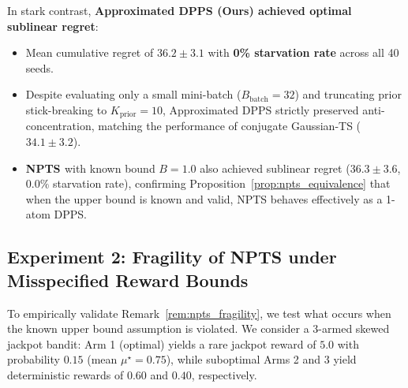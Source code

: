 \documentclass[twoside]{article}
\begin{document}
In stark contrast, \textbf{Approximated DPPS (Ours) achieved optimal sublinear regret}:
\begin{itemize}
    \item Mean cumulative regret of \textbf{$36.2 \pm 3.1$} with \textbf{0\% starvation rate} across all 40 seeds.
    \item Despite evaluating only a small mini-batch ($B_{\text{batch}} = 32$) and truncating prior stick-breaking to $K_{\text{prior}} = 10$, Approximated DPPS strictly preserved anti-concentration, matching the performance of conjugate Gaussian-TS ($34.1 \pm 3.2$).
    \item \textbf{NPTS \citep{riou2020bandit}} with known bound $B = 1.0$ also achieved sublinear regret ($36.3 \pm 3.6$, $0.0\%$ starvation rate), confirming Proposition~\ref{prop:npts_equivalence} that when the upper bound is known and valid, NPTS behaves effectively as a 1-atom DPPS.
\end{itemize}

\begin{table}[t]
\centering
\caption{Performance summary on the Logistic Bandit at $T = 3{,}000$ (mean $\pm$ standard error across 40 runs) alongside per-step decision latency.}
\label{tab:results_summary}
\end{table}

\subsection{Experiment 2: Fragility of NPTS under Misspecified Reward Bounds}
\label{sec:exp_npts}

To empirically validate Remark~\ref{rem:npts_fragility}, we test what occurs when the known upper bound assumption is violated. We consider a 3-armed skewed jackpot bandit: Arm 1 (optimal) yields a rare jackpot reward of $5.0$ with probability $0.15$ (mean $\mu^\star = 0.75$), while suboptimal Arms 2 and 3 yield deterministic rewards of $0.60$ and $0.40$, respectively.
\end{document}
